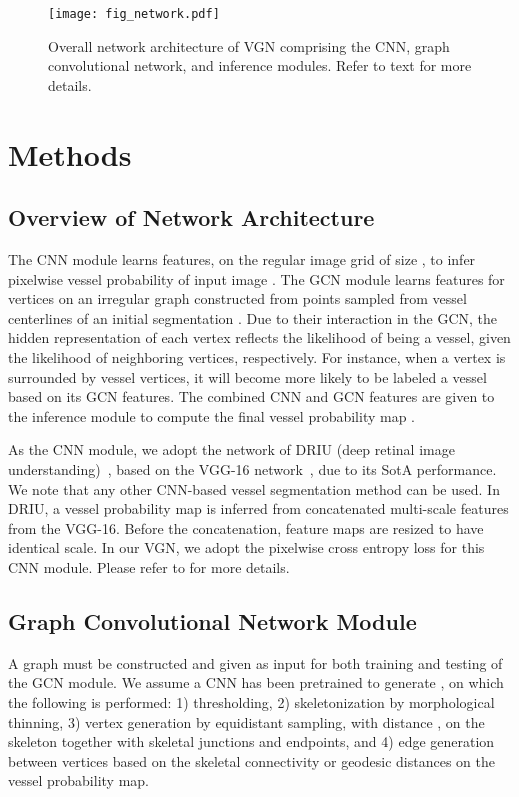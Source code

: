 \documentclass[runningheads,a4paper]{llncs}
\begin{document}
\begin{figure}
	\centering
	\texttt{[image: fig\_network.pdf]}
	\caption{Overall network architecture of VGN comprising the CNN, graph convolutional network, and inference modules. Refer to text for more details.}
	\label{fig:network}
\end{figure}

\section{Methods}

\subsection{Overview of Network Architecture}\label{architecture}

The CNN module learns features, on the regular image grid of size , to infer pixelwise vessel probability  of input image . The GCN module learns features for vertices on an irregular graph constructed from points sampled from vessel centerlines of an initial segmentation . Due to their interaction in the GCN, the hidden representation of each vertex  reflects the likelihood of being a vessel, given the likelihood of neighboring vertices, respectively. For instance, when a vertex is surrounded by vessel vertices, it will become more likely to be labeled a vessel based on its GCN features. The combined CNN and GCN features are given to the inference module to compute the final vessel probability map .

As the CNN module, we adopt the network of DRIU (deep retinal image understanding)~\cite{maninis16}, based on the VGG-16 network~\cite{simonyan14}, due to its SotA performance. We note that any other CNN-based vessel segmentation method can be used. In DRIU, a vessel probability map is inferred from concatenated multi-scale features from the VGG-16. Before the concatenation, feature maps are resized to have identical scale. In our VGN, we adopt the pixelwise cross entropy loss  for this CNN module. Please refer to \cite{maninis16} for more details.

\subsection{Graph Convolutional Network Module}\label{gcn_module}

A graph must be constructed and given as input for both training and testing of the GCN module. We assume a CNN has been pretrained to generate , on which the following is performed: 1) thresholding, 2) skeletonization by morphological thinning, 3) vertex generation by equidistant sampling, with distance , on the skeleton together with skeletal junctions and endpoints, and 4) edge generation between vertices based on the skeletal connectivity or geodesic distances on the vessel probability map.
\end{document}
